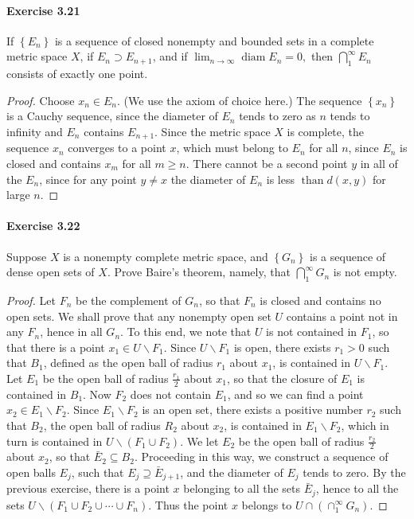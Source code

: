 \documentclass{article}
\theoremstyle{definition}
\begin{document}
\paragraph{Exercise 3.21} If $\left\{E_{n}\right\}$ is a sequence of closed nonempty and bounded sets in a complete metric space $X$, if $E_{n} \supset E_{n+1}$, and if $\lim _{n \rightarrow \infty} \operatorname{diam} E_{n}=0,$ then $\bigcap_{1}^{\infty} E_{n}$ consists of exactly one point.
\begin{proof}
    Choose $x_n \in E_n$. (We use the axiom of choice here.) The sequence $\left\{x_n\right\}$ is a Cauchy sequence, since the diameter of $E_n$ tends to zero as $n$ tends to infinity and $E_n$ contains $E_{n+1}$. Since the metric space $X$ is complete, the sequence $x_n$ converges to a point $x$, which must belong to $E_n$ for all $n$, since $E_n$ is closed and contains $x_m$ for all $m \geq n$. There cannot be a second point $y$ in all of the $E_n$, since for any point $y \neq x$ the diameter of $E_n$ is less $\operatorname{than} d(x, y)$ for large $n$.
\end{proof}



\paragraph{Exercise 3.22} Suppose $X$ is a nonempty complete metric space, and $\left\{G_{n}\right\}$ is a sequence of dense open sets of $X$. Prove Baire's theorem, namely, that $\bigcap_{1}^{\infty} G_{n}$ is not empty.
\begin{proof}
    Let $F_n$ be the complement of $G_n$, so that $F_n$ is closed and contains no open sets. We shall prove that any nonempty open set $U$ contains a point not in any $F_n$, hence in all $G_n$. To this end, we note that $U$ is not contained in $F_1$, so that there is a point $x_1 \in U \backslash F_1$. Since $U \backslash F_1$ is open, there exists $r_1>0$ such that $B_1$, defined as the open ball of radius $r_1$ about $x_1$, is contained in $U \backslash F_1$. Let $E_1$ be the open ball of radius $\frac{r_1}{2}$ about $x_1$, so that the closure of $E_1$ is contained in $B_1$. Now $F_2$ does not contain $E_1$, and so we can find a point $x_2 \in E_1 \backslash F_2$. Since $E_1 \backslash F_2$ is an open set, there exists a positive number $r_2$ such that $B_2$, the open ball of radius $R_2$ about $x_2$, is contained in $E_1 \backslash F_2$, which in turn is contained in $U \backslash\left(F_1 \cup F_2\right)$. We let $E_2$ be the open ball of radius $\frac{r_2}{2}$ about $x_2$, so that $\bar{E}_2 \subseteq B_2$. Proceeding in this way, we construct a sequence of open balls $E_j$, such that $E_j \supseteq \bar{E}_{j+1}$, and the diameter of $E_j$ tends to zero. By the previous exercise, there is a point $x$ belonging to all the sets $\bar{E}_j$, hence to all the sets $U \backslash\left(F_1 \cup F_2 \cup \cdots \cup F_n\right)$. Thus the point $x$ belongs to $U \cap\left(\cap_1^{\infty} G_n\right)$.
\end{proof}
\end{document}
